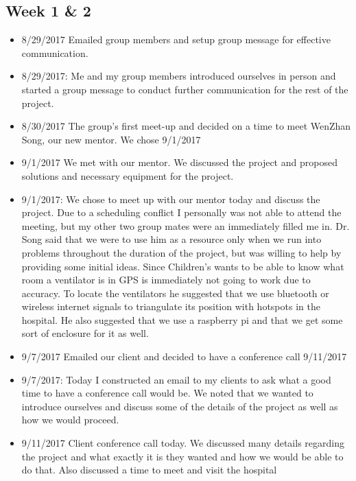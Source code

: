 \documentclass[12pt]{article}
\begin{document}
	\subsection{Week 1 \& 2}
		\begin{itemize}
			\item 8/29/2017 Emailed group members and setup group message for effective
			communication.
			\item 8/29/2017: Me and my group members introduced ourselves in person and started a group message to conduct further communication for the rest of the project.
			\item 8/30/2017 The group’s first meet-up and decided on a time to meet WenZhan Song, 
			our new mentor. We chose 9/1/2017
			\item 9/1/2017 We met with our mentor. We discussed the project and proposed 
			solutions and necessary equipment for the project.
			\item 9/1/2017: We chose to meet up with our mentor today and discuss the project.  Due to a scheduling conflict I personally was not able to attend the meeting, but my other two group mates were an immediately filled me in.  Dr. Song said that we were to use him as a resource only when we run into problems throughout the duration of the project, but was willing to help by providing some initial ideas.  Since Children’s wants to be able to know what room a ventilator is in GPS is immediately not going to work due to accuracy.  To locate the ventilators he suggested that we use bluetooth or wireless internet signals to triangulate its position with hotspots in the hospital.  He also suggested that we use a raspberry pi and that we get some sort of enclosure for it as well.
			\item 9/7/2017 Emailed our client and decided to have a conference call 9/11/2017
			\item 9/7/2017: Today I constructed an email to my clients to ask what a good time to have a conference call would be.  We noted that we wanted to introduce ourselves and discuss some of the details of the project as well as how we would proceed.
			\item 9/11/2017 Client conference call today. We discussed many details regarding the 
			project and what exactly it is they wanted and how we would be able to do that. Also 
			discussed a time to meet and visit the hospital

\end{itemize}
\end{document}
